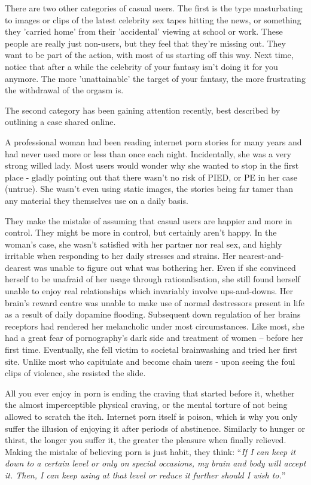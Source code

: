 \documentclass[
]{book}
\begin{document}
There are two other categories of casual users. The first is the type masturbating to images or clips of the latest celebrity sex tapes hitting the news, or something they 'carried home' from their 'accidental' viewing at school or work. These people are really just non-users, but they feel that they're missing out. They want to be part of the action, with most of us starting off this way. Next time, notice that after a while the celebrity of your fantasy isn't doing it for you anymore. The more 'unattainable' the target of your fantasy, the more frustrating the withdrawal of the orgasm is.

The second category has been gaining attention recently, best described by outlining a case shared online.

A professional woman had been reading internet porn stories for many years and had never used more or less than once each night. Incidentally, she was a very strong willed lady. Most users would wonder why she wanted to stop in the first place - gladly pointing out that there wasn't no risk of PIED, or PE in her case (untrue). She wasn't even using static images, the stories being far tamer than any material they themselves use on a daily basis.

They make the mistake of assuming that casual users are happier and more in control. They might be more in control, but certainly aren't happy. In the woman's case, she wasn't satisfied with her partner nor real sex, and highly irritable when responding to her daily stresses and strains. Her nearest-and-dearest was unable to figure out what was bothering her. Even if she convinced herself to be unafraid of her usage through rationalisation, she still found herself unable to enjoy real relationships which invariably involve ups-and-downs. Her brain's reward centre was unable to make use of normal destressors present in life as a result of daily dopamine flooding. Subsequent down regulation of her brains receptors had rendered her melancholic under most circumstances. Like most, she had a great fear of pornography's dark side and treatment of women -- before her first time. Eventually, she fell victim to societal brainwashing and tried her first site. Unlike most who capitulate and become chain users - upon seeing the foul clips of violence, she resisted the slide.

All you ever enjoy in porn is ending the craving that started before it, whether the almost imperceptible physical craving, or the mental torture of not being allowed to scratch the itch. Internet porn itself is poison, which is why you only suffer the illusion of enjoying it after periods of abstinence. Similarly to hunger or thirst, the longer you suffer it, the greater the pleasure when finally relieved. Making the mistake of believing porn is just habit, they think: ``\emph{If I can keep it down to a certain level or only on special occasions, my brain and body will accept it. Then, I can keep using at that level or reduce it further should I wish to.}''
\end{document}
